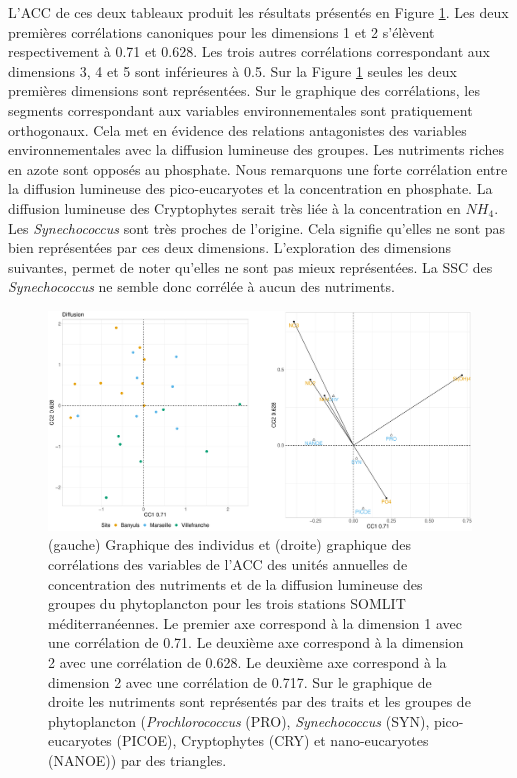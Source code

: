 \documentclass[12pt]{article}
\begin{document}
L’ACC de ces deux tableaux produit les résultats présentés en Figure \ref{cca_diff}. Les deux premières corrélations canoniques pour les dimensions 1 et 2 s’élèvent respectivement à 0.71 et 0.628.  Les trois autres corrélations correspondant aux dimensions 3, 4 et 5 sont inférieures à 0.5. Sur la Figure \ref{cca_diff} seules les deux premières dimensions sont représentées. Sur le graphique des corrélations, les segments correspondant aux variables environnementales sont pratiquement orthogonaux. Cela met en évidence des relations antagonistes des variables environnementales avec la diffusion lumineuse des groupes. Les nutriments riches en azote sont opposés au phosphate.  Nous remarquons une forte corrélation entre la diffusion lumineuse des pico-eucaryotes et la concentration en phosphate. La diffusion lumineuse des Cryptophytes serait très liée à la concentration en $NH_4$. Les \textit{Synechococcus} sont très proches de l’origine. Cela signifie qu’elles ne sont pas bien représentées par ces deux dimensions. L'exploration des dimensions suivantes, permet de noter qu'elles ne sont pas mieux représentées. La SSC des \textit{Synechococcus} ne semble donc corrélée à aucun des nutriments.

\begin{figure}
\centering
\includegraphics[width=.95\textwidth]{fig/R232_CCA_diff.pdf}
\caption{(gauche) Graphique des individus et (droite) graphique des corrélations des variables de l'ACC des unités annuelles de concentration des nutriments et de la diffusion lumineuse des groupes du phytoplancton pour les trois stations SOMLIT méditerranéennes. Le premier axe correspond à la dimension 1 avec une corrélation de 0.71. Le deuxième axe correspond à la dimension 2 avec une corrélation de 0.628. Le deuxième axe correspond à la dimension 2 avec une corrélation de 0.717. Sur le graphique de droite les nutriments sont représentés par des traits et les groupes de phytoplancton (\textit{Prochlorococcus} (PRO), \textit{Synechococcus} (SYN), pico-eucaryotes (PICOE), Cryptophytes (CRY) et nano-eucaryotes (NANOE)) par des triangles.}
\label{cca_diff}
\end{figure}
\end{document}
